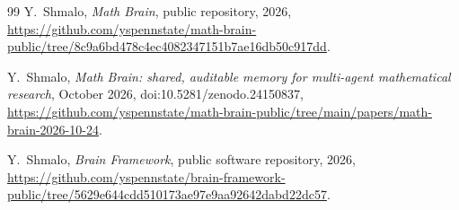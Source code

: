 \documentclass[11pt]{amsart}
\theoremstyle{remark}
\numberwithin{equation}{section}
\begin{document}
\begin{thebibliography}{99}
 Y.~Shmalo, \emph{Math Brain}, public repository, 2026, \url{https://github.com/yspennstate/math-brain-public/tree/8c9a6bd478c4ec4082347151b7ae16db50c917dd}.

 Y.~Shmalo, \emph{Math Brain: shared, auditable memory for multi-agent mathematical research}, October 2026, doi:10.5281/zenodo.24150837,
\url{https://github.com/yspennstate/math-brain-public/tree/main/papers/math-brain-2026-10-24}.

 Y.~Shmalo, \emph{Brain Framework}, public software repository, 2026, \url{https://github.com/yspennstate/brain-framework-public/tree/5629e644cdd510173ae97e9aa92642dabd22dc57}.
\end{thebibliography}
\end{document}
